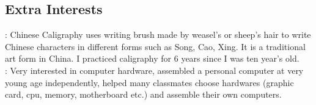 \documentclass[mm]{simple_style}
\begin{document}
\begin{resume}
\section{Extra Interests}
: Chinese Caligraphy uses writing brush made by weasel's or sheep's hair to write Chinese characters in different forms such as Song, Cao, Xing. It is a traditional art form in China. I practiced caligraphy for 6 years since I was ten year's old. \\
: Very interested in computer hardware, assembled a personal computer at very young age independently, helped many classmates choose hardwares (graphic card, cpu, memory, motherboard etc.) and assemble their own computers.
\end{resume}
\end{document}
